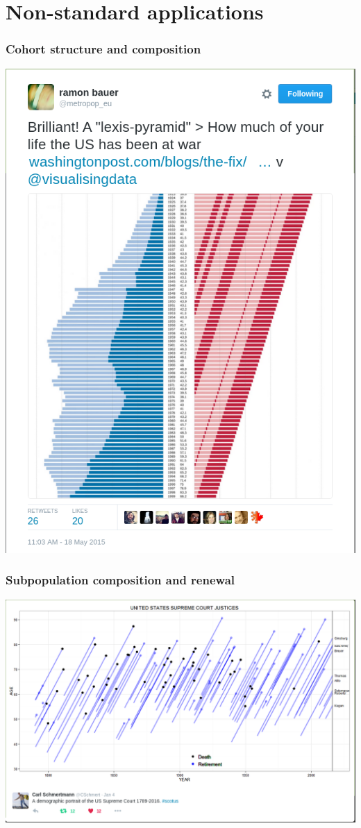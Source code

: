 \documentclass[20pt]{beamer}
\begin{document}
\section{Non-standard applications}
\begin{frame}
\frametitle{Cohort structure and composition}
\includegraphics[scale=.55]{Figures/WPLexisPyramid.png}
\end{frame}


\begin{frame}
\frametitle{Subpopulation composition and renewal}
\includegraphics[scale=.65]{Figures/SchmertmannJustices.png}
\end{frame}
\end{document}
